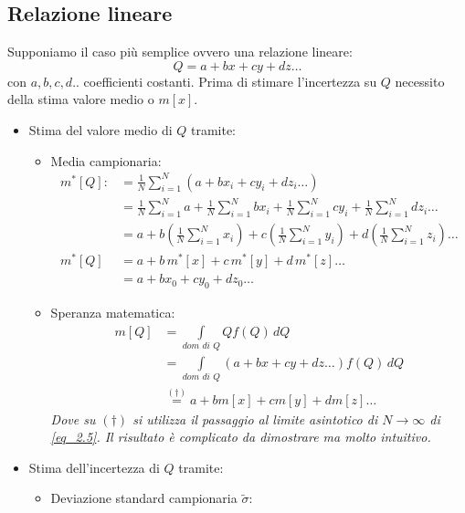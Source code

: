 \documentclass[11pt,a4paper]{book}
\begin{document}
\subsection{Relazione lineare} \label{2.1_Propazagione incertezza in relaz lineare} 
Supponiamo il caso più semplice ovvero una relazione lineare:
\begin{equation}
Q = a +bx+cy+dz \dots
\end{equation}
con $ a, b, c, d.. $ coefficienti costanti. Prima di stimare l'incertezza su $ Q $ necessito della stima valore medio o $ m[x] $.
\begin{itemize}
\item Stima del valore medio di $ Q $ tramite:
\begin{itemize}
\item Media campionaria:
\begin{align}
m^*[Q] : &= \frac{1}{N}\sum\limits_{i = 1}^{N} (a +bx_i+cy_i+dz_i \dots) \\ & = \frac{1}{N}\sum\limits_{i = 1}^{N} a + \frac{1}{N}\sum\limits_{i = 1}^{N} bx_i  + \frac{1}{N}\sum\limits_{i = 1}^{N} cy_i  + \frac{1}{N}\sum\limits_{i = 1}^{N} d z_i \dots \\
&= a + b\left( \frac{1}{N}\sum\limits_{i = 1}^{N} x_i \right) + c\left( \frac{1}{N}\sum\limits_{i = 1}^{N} y_i \right) + d\left( \frac{1}{N}\sum\limits_{i = 1}^{N} z_i \right)\dots \\
m^*[Q] &= a + b \, m^*[x] +c \, m^*[y] +d \, m^*[z]\dots \\
	&= a + bx_0 +cy_0+dz_0 \dots\label{eq_2.5}
\end{align}
\item Speranza matematica:  \label{Def: speranza matematica}
\begin{align}
m[Q] &= \int\limits_{\textit{dom di Q}} Q f(Q)\,dQ \\ 
& = \int\limits_{\textit{dom di Q}} (a +bx + cy + dz \dots ) f(Q)\,dQ \\
& \stackrel{(\dag)}{=}  a + bm[x]+cm[y]+dm[z]\dots
\end{align}
\textit{Dove su $ (\dag) $ si utilizza il passaggio al limite asintotico di $ N \to \infty $ di \eqref{eq_2.5}. Il risultato è complicato da dimostrare ma molto intuitivo.}
\end{itemize}
\item Stima dell'incertezza di $ Q $ tramite:
\begin{itemize}
\item Deviazione standard campionaria $ \tilde{\sigma} $:

\end{itemize}
\end{itemize}
\end{document}
